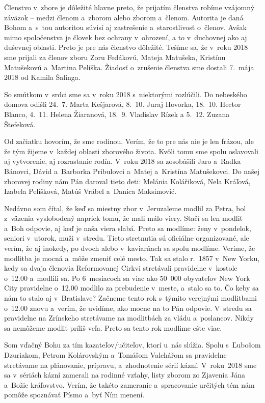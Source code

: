 Členstvo v~zbore je dôležité hlavne preto, že prijatím členstva robíme vzájomný záväzok -- medzi členom a~zborom alebo zborom a~členom. Autorita je daná Bohom a~s~tou autoritou súvisí aj zastrešenie a~starostlivosť o~členov. Avšak mimo spoločenstva je človek bez ochrany v~ohrození, a to v~duchovnej ako aj duševnej oblasti. Preto je pre nás členstvo dôležité. Tešíme sa, že v~roku 2018 sme prijali za členov zboru Zoru Fedákovú, Mateja Matušeka, Kristínu Matušekovú a~Martina Pelíška. Žiadosť o~zrušenie členstva sme dostali 7.~mája 2018 od Kamila Šalinga.

So smútkom v~srdci sme sa v~roku 2018 s~niektorými rozlúčili. Do nebeského domova odišli 24.~7. Marta Kešjarová, 8.~10. Juraj Hovorka, 18.~10. Hector Blanco, 4.~11. Helena Žiaranová, 18.~9. Vladislav Rízek a 5.~12. Zuzana Štefeková.


Od začiatku hovorím, že sme rodinou. Verím, že to pre nás nie je len frázou, ale že tým žijeme v~každej oblasti zborového života. Kvôli tomu sme spolu oslavovali aj vytvorenie, aj rozrastanie rodín. V~roku 2018 sa zosobášili Jaro a~Radka Bánovci, Dávid a~Barborka Pribulovci a~Matej a~Kristína Matušekovci.  Do našej zborovej rodiny nám Pán daroval tieto deti: Melánia Kolářiková, Nela Kráľová, Izabela Pelíšková, Matúš Vrábel a~Danica Maksimović.


Nedávno som čítal, že keď sa miestny zbor v~Jeruzaleme modlil za Petra, bol z~väzenia vyslobodený napriek tomu, že mali málo viery. Stačí sa len modliť a~Boh odpovie, aj keď je naša viera slabá. Preto sa modlíme:  ženy v~pondelok, seniori v~utorok, muži v~stredu. Tieto stretnutia sú oficiálne organizované, ale verím, že aj inokedy, po dvoch alebo v~kaviarňach sa spolu modlíme. Veríme, že modlitba je mocná a~môže zmeniť celé mesto. Tak sa stalo r.~1857 v~New Yorku, kedy sa dvaja členovia Reformovanej Cirkvi stretávali pravidelne v~kostole o~12.00 a~modlili sa. Po 6~mesiacoch sa viac ako 50~000 obyvateľov New York City pravidelne o~12.00 modlilo za prebudenie v~meste, a~stalo sa to. Čo keby sa nám to stalo aj v~Bratislave? Začneme tento rok s~týmito verejnými modlitbami o~12.00 znovu a~verím, že uvidíme, ako mocne na to Pán odpovie. V~stredu sa pravidelne na Zrínskeho stretávame na modlitbách za vládu a~poslancov. Nikdy sa nemôžeme modliť príliš veľa. Preto sa tento rok modlime ešte viac.


Som vďačný Bohu za tím kazateľov/učiteľov, ktorí u~nás slúžia. Spolu s~Ľubošom Dzuriakom, Petrom Kolárovským a~Tomášom Valchářom sa pravidelne stretávame na plánovanie, prípravu, a~zhodnotenie sérií kázní. V~roku~2018 sme sa v~sériách kázní zamerali na rodinné vzťahy, listy zborom zo Zjavenia Jána a~Božie kráľovstvo. Verím, že takéto zameranie a~spracovanie určitých tém nám pomôže spoznávať Písmo a~byť Ním menení.

